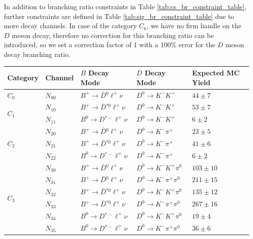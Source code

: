 In addition to branching ratio constraints in Table \ref{tab:cs_br_constraint_table}, further constraints are defined in Table \ref{tab:sig_br_constraint_table} due to more decay channels. In case of the category $C_6$, we have no firm handle on the $D$ meson decay, therefore no correction for this branching ratio can be introduced, so we set a correction factor of $1$ with a $100\%$ error for the $D$ meson decay branching ratio.


\begin{table}[!htbp]
	\centering
	\begin{tabular}{|l|l|l|l|l|}
		\hline
		Category & Channel & $B$ Decay Mode & $D$ Decay Mode & Expected MC Yield \\
		\hline
	
		$C_0$ & $N_{00}$ &  $B^+ \to \bar D {}^{0} \ell^+ \nu$ & $D^0 \to K^-K^+$ & $44\pm7$\\
		\hline
		\hline
	
		\multirow{2}{*}{$C_1$} & $N_{10}$ & $B^+ \to \bar D {}^{*0} \ell^+ \nu$ & $D^0 \to K^-K^+$ & $53\pm7$\\
		 \cline{2-5}	 
		 & $N_{11}$ & $B^0 \to D {}^{*-} \ell^+ \nu$  & $D^0 \to K^-K^+$ & $6\pm2$\\
		\hline
		\hline
		
		\multirow{3}{*}{$C_2$} & $N_{20}$ & $B^+ \to \bar D {}^{0} \ell^+ \nu$ & $D^0 \to K^-\pi^+$ & $23\pm5$\\
        \cline{2-5}	 
    	 & $N_{21}$ & $B^+ \to \bar D {}^{*0} \ell^+ \nu$  & $D^0 \to K^-\pi^+$ & $41\pm6$\\
		\cline{2-5}	 
		& $N_{22}$ & $B^0 \to D {}^{*-} \ell^+ \nu$  & $D^0 \to K^-\pi^+$ & $6\pm2$\\
		\hline
		\hline
		
		\multirow{6}{*}{$C_3$} & $N_{30}$ & $B^+ \to \bar D {}^{0} \ell^+ \nu$ & $D^0 \to K^-K^+\pi^0$ & $103\pm10$\\
        \cline{2-5}	 
    	 & $N_{31}$ & $B^+ \to \bar D {}^{0} \ell^+ \nu$ & $D^0 \to K^-\pi^+\pi^0$ & $211\pm15$\\
		\cline{2-5}	 
		& $N_{32}$ & $B^+ \to \bar D {}^{*0} \ell^+ \nu$ & $D^0 \to K^-K^+\pi^0$ & $135\pm12$\\
		\cline{2-5}
		& $N_{33}$ & $B^+ \to \bar D {}^{*0} \ell^+ \nu$ & $D^0 \to K^-\pi^+\pi^0$ & $267\pm16$\\
		\cline{2-5}
		& $N_{34}$ & $B^0 \to D {}^{*-} \ell^+ \nu$ & $D^0 \to K^-K^+\pi^0$ & $19\pm4$\\
		\cline{2-5}
		& $N_{35}$ & $B^0 \to D {}^{*-} \ell^+ \nu$ & $D^0 \to K^-\pi^+\pi^0$ & $36\pm6$\\
		\hline
		\hline	
		

\end{tabular}
\end{table}
